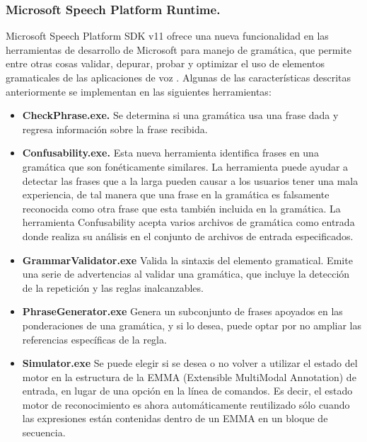 \documentclass[11pt,a4paper]{article}
\begin{document}
\subsubsection{Microsoft Speech Platform Runtime.}
Microsoft Speech Platform SDK v11 ofrece una nueva funcionalidad en las herramientas de desarrollo de Microsoft para manejo de gramática, que permite entre otras cosas validar, depurar, probar y optimizar el uso de elementos gramaticales de las aplicaciones de voz \cite{Microsoft Speech Platform Runtime}. Algunas de las características descritas anteriormente se implementan en las siguientes herramientas:
\begin{itemize}
\item \textbf{CheckPhrase.exe.} Se determina si una gramática usa una frase dada y regresa información sobre la frase recibida. %
\item \textbf{Confusability.exe.} Esta nueva herramienta identifica frases en una gramática que son fonéticamente similares. La herramienta puede ayudar a detectar las frases que a la larga pueden causar a los usuarios tener una mala experiencia, de tal manera que una frase en la gramática es falsamente reconocida como otra frase que esta también incluida en la gramática. La herramienta Confusability acepta varios archivos de gramática como entrada donde realiza su análisis en el conjunto de archivos de entrada especificados.
\item \textbf{GrammarValidator.exe} Valida la sintaxis del elemento gramatical. Emite una serie de advertencias al validar una gramática, que incluye la detección de la repetición y las reglas inalcanzables.
\item \textbf{PhraseGenerator.exe} Genera un subconjunto de frases apoyados en las ponderaciones de una gramática, y si lo desea, puede optar por no ampliar las referencias específicas de la regla.
\item \textbf{Simulator.exe} Se puede elegir si se desea o no volver a utilizar el estado del motor en la estructura de la EMMA (Extensible MultiModal Annotation)  de entrada, en lugar de una opción en la línea de comandos. Es decir, el estado motor de reconocimiento es ahora automáticamente reutilizado sólo cuando las expresiones están contenidas dentro de un EMMA en un bloque de secuencia.  

\end{itemize}
\end{document}
